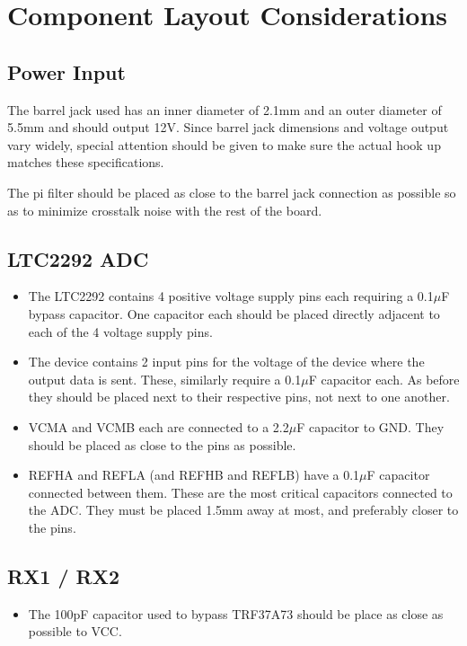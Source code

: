 \documentclass{default}
\begin{document}
\section{Component Layout Considerations}

\subsection{Power Input}
\label{sec:power-input-layout}

The barrel jack used has an inner diameter of 2.1mm and an outer diameter of 5.5mm and should output
12V. Since barrel jack dimensions and voltage output vary widely, special attention should be given
to make sure the actual hook up matches these specifications.

The pi filter should be placed as close to the barrel jack connection as possible so as to minimize
crosstalk noise with the rest of the board.

\subsection{LTC2292 ADC}

\begin{itemize}
\item The LTC2292 contains 4 positive voltage supply pins each requiring a 0.1$\mu$F bypass
  capacitor. One capacitor each should be placed directly adjacent to each of the 4 voltage supply
  pins.
\item The device contains 2 input pins for the voltage of the device where the output data
  is sent. These, similarly require a 0.1$\mu$F capacitor each. As before they should be placed next
  to their respective pins, not next to one another.
\item VCMA and VCMB each are connected to a 2.2$\mu$F capacitor to GND. They should be placed
  as close to the pins as possible.
\item REFHA and REFLA (and REFHB and REFLB) have a 0.1$\mu$F capacitor connected between
  them. These are the most critical capacitors connected to the ADC. They must be placed 1.5mm away
  at most, and preferably closer to the pins.
\end{itemize}

\subsection{RX1 / RX2}

\begin{itemize}
\item The 100pF capacitor used to bypass TRF37A73 should be place as close as possible to VCC.
\end{itemize}
\end{document}
